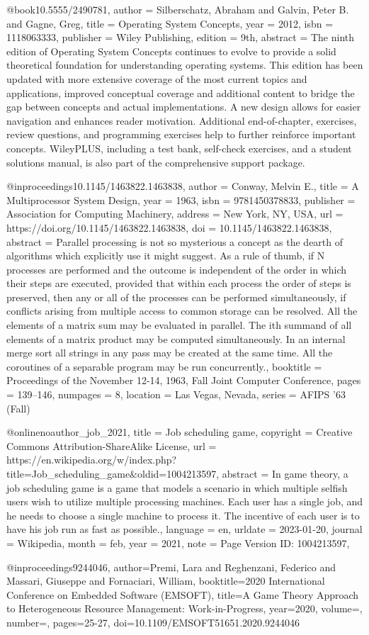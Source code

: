 @book{10.5555/2490781,
author = {Silberschatz, Abraham and Galvin, Peter B. and Gagne, Greg},
title = {Operating System Concepts},
year = {2012},
isbn = {1118063333},
publisher = {Wiley Publishing},
edition = {9th},
abstract = {The ninth edition of Operating System Concepts continues to evolve to provide a solid theoretical foundation for understanding operating systems. This edition has been updated with more extensive coverage of the most current topics and applications, improved conceptual coverage and additional content to bridge the gap between concepts and actual implementations. A new design allows for easier navigation and enhances reader motivation. Additional end-of-chapter, exercises, review questions, and programming exercises help to further reinforce important concepts. WileyPLUS, including a test bank, self-check exercises, and a student solutions manual, is also part of the comprehensive support package.}
}

@inproceedings{10.1145/1463822.1463838,
author = {Conway, Melvin E.},
title = {A Multiprocessor System Design},
year = {1963},
isbn = {9781450378833},
publisher = {Association for Computing Machinery},
address = {New York, NY, USA},
url = {https://doi.org/10.1145/1463822.1463838},
doi = {10.1145/1463822.1463838},
abstract = {Parallel processing is not so mysterious a concept as the dearth of algorithms which explicitly use it might suggest. As a rule of thumb, if N processes are performed and the outcome is independent of the order in which their steps are executed, provided that within each process the order of steps is preserved, then any or all of the processes can be performed simultaneously, if conflicts arising from multiple access to common storage can be resolved. All the elements of a matrix sum may be evaluated in parallel. The ith summand of all elements of a matrix product may be computed simultaneously. In an internal merge sort all strings in any pass may be created at the same time. All the coroutines of a separable program may be run concurrently.},
booktitle = {Proceedings of the November 12-14, 1963, Fall Joint Computer Conference},
pages = {139–146},
numpages = {8},
location = {Las Vegas, Nevada},
series = {AFIPS '63 (Fall)}
}

@online{noauthor_job_2021,
	title = {Job scheduling game},
	copyright = {Creative Commons Attribution-ShareAlike License},
	url = {https://en.wikipedia.org/w/index.php?title=Job_scheduling_game&oldid=1004213597},
	abstract = {In game theory, a job scheduling game is a game that models a scenario in which multiple selfish users wish to utilize multiple processing machines. Each user has a single job, and he needs to choose a single machine to process it. The incentive of each user is to have his job run as fast as possible.},
	language = {en},
	urldate = {2023-01-20},
	journal = {Wikipedia},
	month = feb,
	year = {2021},
	note = {Page Version ID: 1004213597},
}


@inproceedings{9244046,
author={Premi, Lara and Reghenzani, Federico and Massari, Giuseppe and Fornaciari, William},
booktitle={2020 International Conference on Embedded Software (EMSOFT)}, 
title={A Game Theory Approach to Heterogeneous Resource Management: Work-in-Progress}, 
year={2020},
volume={},
number={},
pages={25-27},
doi={10.1109/EMSOFT51651.2020.9244046}
}

